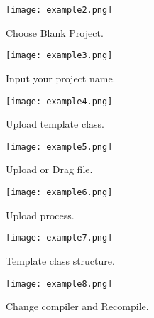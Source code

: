 \begin{appendices}
\begin{figure}[t!]
  \centering
  \texttt{[image: example2.png]}
  \caption{Choose Blank Project.}
  \label{fig:example2}
\end{figure}

\begin{figure}[t!]
  \centering
  \texttt{[image: example3.png]}
  \caption{Input your project name.}
  \label{fig:example3}
\end{figure}

\begin{figure}[t!]
  \centering
  \texttt{[image: example4.png]}
  \caption{Upload template class.}
  \label{fig:example4}
\end{figure}

\begin{figure}[t!]
  \centering
  \texttt{[image: example5.png]}
  \caption{Upload or Drag file.}
  \label{fig:example5}
\end{figure}

\begin{figure}[t!]
  \centering
  \texttt{[image: example6.png]}
  \caption{Upload process.}
  \label{fig:example6}
\end{figure}

\begin{figure}[t!]
  \centering
  \texttt{[image: example7.png]}
  \caption{Template class structure.}
  \label{fig:example7}
\end{figure}

\begin{figure}[t]
  \centering
  \texttt{[image: example8.png]}
  \caption{Change compiler and Recompile.}
  \label{fig:example8}
\end{figure}

\end{appendices}
\endappendices